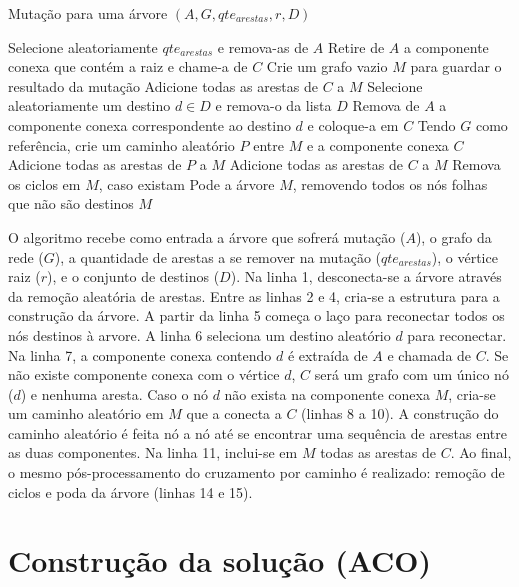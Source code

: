 \begin{algorithm}
	\caption{Mutação para uma árvore $(A, G, qte_{arestas}, r, D)$}
	\label{alg_prm_mutacao}
	\begin{algorithmic}[1]
		\State Selecione aleatoriamente $qte_{arestas}$ e remova-as de $A$
		\State Retire de $A$ a componente conexa que contém a raiz e chame-a de $C$
		\State Crie um grafo vazio $M$ para guardar o resultado da mutação
		\State Adicione todas as arestas de $C$ a $M$
			\State Selecione aleatoriamente um destino $d \in D$ e remova-o da lista $D$
			\State Remova de $A$ a componente conexa correspondente ao destino $d$ e coloque-a em $C$
				\State Tendo $G$ como referência, crie um caminho aleatório $P$ entre $M$ e a componente conexa $C$
				\State Adicione todas as arestas de $P$ a $M$
			\EndIf
			\State Adicione todas as arestas de $C$ a $M$
		\EndWhile
		\State Remova os ciclos em $M$, caso existam
		\State Pode a árvore $M$, removendo todos os nós folhas que não são destinos
		\State \Return $M$
	\end{algorithmic}
\end{algorithm}

O algoritmo recebe como entrada a árvore que sofrerá mutação ($A$), o grafo da rede ($G$), a quantidade de arestas a se remover na mutação ($qte_{arestas}$), o vértice raiz ($r$), e o conjunto de destinos ($D$). Na linha 1, desconecta-se a árvore através da remoção aleatória de arestas. Entre as linhas 2 e 4, cria-se a estrutura para a construção da árvore. A partir da linha 5 começa o laço para reconectar todos os nós destinos à arvore. A linha 6 seleciona um destino aleatório $d$ para reconectar. Na linha 7, a componente conexa contendo $d$ é extraída de $A$ e chamada de $C$. Se não existe componente conexa com o vértice $d$, $C$ será um grafo com um único nó ($d$) e nenhuma aresta. Caso o nó $d$ não exista na componente conexa $M$, cria-se um caminho aleatório em $M$ que a conecta a $C$ (linhas 8 a 10). A construção do caminho aleatório é feita nó a nó até se encontrar uma sequência de arestas entre as duas componentes. Na linha 11, inclui-se em $M$ todas as arestas de $C$. Ao final, o mesmo pós-processamento do cruzamento por caminho é realizado: remoção de ciclos e poda da árvore (linhas 14 e 15).

\section{Construção da solução (ACO)}
\label{section_estrategias_prm_aco}


